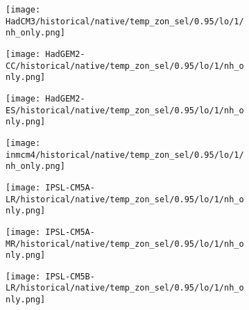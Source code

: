 \documentclass[preview]{standalone}
\begin{document}
\begin{figure}
  \begin{subfigure}[t]{\textwidth}
    \texttt{[image: HadCM3/historical/native/temp\_zon\_sel/0.95/lo/1/nh\_only.png]}
  \end{subfigure}
\end{figure}

\begin{figure}
  \begin{subfigure}[t]{\textwidth}
    \texttt{[image: HadGEM2-CC/historical/native/temp\_zon\_sel/0.95/lo/1/nh\_only.png]}
  \end{subfigure}
\end{figure}

\begin{figure}
  \begin{subfigure}[t]{\textwidth}
    \texttt{[image: HadGEM2-ES/historical/native/temp\_zon\_sel/0.95/lo/1/nh\_only.png]}
  \end{subfigure}
\end{figure}

\begin{figure}
  \begin{subfigure}[t]{\textwidth}
    \texttt{[image: inmcm4/historical/native/temp\_zon\_sel/0.95/lo/1/nh\_only.png]}
  \end{subfigure}
\end{figure}

\begin{figure}
  \begin{subfigure}[t]{\textwidth}
    \texttt{[image: IPSL-CM5A-LR/historical/native/temp\_zon\_sel/0.95/lo/1/nh\_only.png]}
  \end{subfigure}
\end{figure}

\begin{figure}
  \begin{subfigure}[t]{\textwidth}
    \texttt{[image: IPSL-CM5A-MR/historical/native/temp\_zon\_sel/0.95/lo/1/nh\_only.png]}
  \end{subfigure}
\end{figure}

\begin{figure}
  \begin{subfigure}[t]{\textwidth}
    \texttt{[image: IPSL-CM5B-LR/historical/native/temp\_zon\_sel/0.95/lo/1/nh\_only.png]}
  \end{subfigure}
\end{figure}
\end{document}
